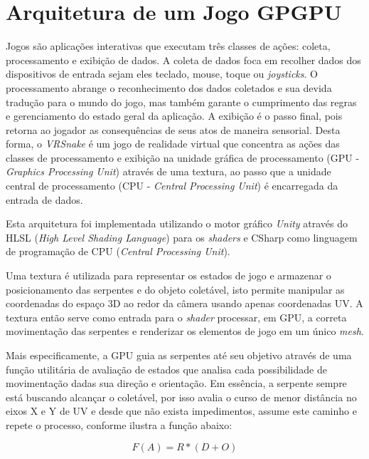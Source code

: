 \documentclass[conference]{IEEEtran}
\begin{document}
\section{Arquitetura de um Jogo GPGPU} \label{sec:architecture}
Jogos são aplicações interativas que executam três classes de ações: coleta, processamento e exibição de dados. %
A coleta de dados foca em recolher dados dos dispositivos de entrada sejam eles teclado, mouse, toque ou \textit{joysticks}. O processamento abrange o reconhecimento dos dados coletados e sua devida tradução para o mundo do jogo, mas também garante o cumprimento das regras e gerenciamento do estado geral da aplicação. A exibição é o passo final, pois retorna ao jogador as consequências de seus atos de maneira sensorial. Desta forma, o \textit{VRSnake} é um jogo de realidade virtual que concentra as ações das classes de processamento e exibição na unidade gráfica de processamento (GPU - \textit{Graphics Processing Unit}) através de uma textura, ao passo que a unidade central de processamento (CPU - \textit{Central Processing Unit}) é encarregada da entrada de dados.

Esta arquitetura foi implementada utilizando o motor gráfico \textit{Unity} através do HLSL (\textit{High Level Shading Language}) para os \textit{shaders} e CSharp como linguagem de programação de CPU (\textit{Central Processing Unit}).

Uma textura é utilizada para representar os estados de jogo e armazenar o posicionamento das serpentes e do objeto coletável, isto permite manipular as coordenadas do espaço 3D ao redor da câmera usando apenas coordenadas UV. A textura então serve como entrada para o \textit{shader} processar, em GPU, a correta movimentação das serpentes e renderizar os elementos de jogo em um único \textit{mesh}.

Mais especificamente, a GPU guia as serpentes até seu objetivo através de uma função utilitária de avaliação de estados que analisa cada possibilidade de movimentação dadas sua direção e orientação. Em essência, a serpente sempre está buscando alcançar o coletável, por isso avalia o curso de menor distância no eixos X e Y de UV e desde que não exista impedimentos, assume este caminho e repete o processo, conforme ilustra a função abaixo:

\begin{equation}
F(A) = R * (D + O)
\label{equation11}
\end{equation}
\end{document}
